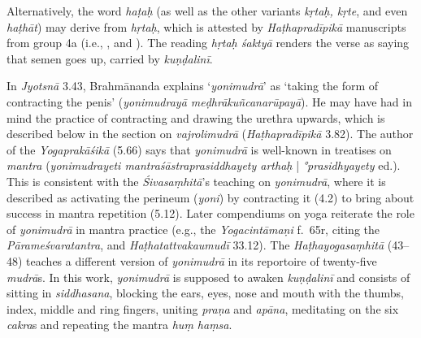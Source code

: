 \begin{ekdosis}
\begin{philcomm}[hp03_040]
Alternatively, the word \emph{haṭaḥ} (as well as the other variants \emph{kṛtaḥ, kṛte}, and even \emph{haṭhāt}) may derive from \emph{hṛtaḥ}, which is attested by \emph{Haṭhapradīpikā} manuscripts from group 4a (i.e., ,  and ). The reading \emph{hṛtaḥ śaktyā} renders the verse as saying that semen goes up, carried by \emph{kuṇḍalinī}. 





%



In \emph{Jyotsnā} 3.43, Brahmānanda explains `\emph{yonimudrā}' as `taking the form of contracting the penis' (\emph{yonimudrayā meḍhrākuñcanarūpayā}). He may have had in mind the practice of contracting and drawing the urethra upwards, which is described below in the section on \emph{vajrolimudrā} (\emph{Haṭhapradīpikā} 3.82). The author of the \emph{Yogaprakāśikā} (5.66) says that \emph{yonimudrā} is well-known in treatises on \emph{mantra} (\emph{yonimudrayeti mantraśāstraprasiddhayety arthaḥ} | \emph{°prasidhyayety} ed.). This is consistent with the \emph{Śivasaṃhitā}'s teaching on \emph{yonimudrā}, where it is described as activating the perineum (\emph{yoni}) by contracting it (4.2) to bring about success in mantra repetition (5.12). Later compendiums on yoga reiterate the role of \emph{yonimudrā} in mantra practice (e.g., the \emph{Yogacintāmaṇi} f.~65r, citing the \emph{Pārameśvaratantra}, and \emph{Haṭhatattvakaumudī} 33.12). The \emph{Haṭhayogasaṃhitā} (43–48) teaches a different version of \emph{yonimudrā} in its reportoire of twenty-five \emph{mudrā}s. In this work, \emph{yonimudrā} is supposed to awaken \emph{kuṇḍalinī} and consists of sitting in \emph{siddhasana}, blocking the ears, eyes, nose and mouth with the thumbs, index, middle and ring fingers, uniting \emph{praṇa} and \emph{apāna}, meditating on the six \emph{cakra}s and repeating the mantra \emph{huṃ haṃsa}. 


\end{philcomm}
\end{ekdosis}
